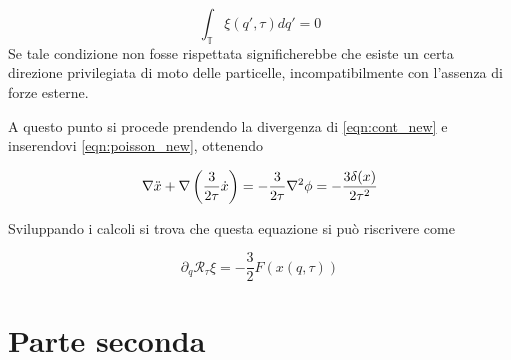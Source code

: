 \begin{equation}
    \int_{\mathbb{T}}\xi(q', \tau) dq' = 0
\end{equation}
Se tale condizione non fosse rispettata significherebbe che esiste un certa direzione
privilegiata di moto delle particelle, incompatibilmente con l'assenza di forze esterne.

A questo punto si procede prendendo la divergenza di \ref{eqn:cont_new} e inserendovi 
\ref{eqn:poisson_new}, ottenendo

\begin{equation}
    \nabla \ddot{x} + \nabla \left(\frac{3}{2\tau}\dot{x}\right) = -\frac{3}{2\tau}\laplacian\phi = -\frac{3\delta(x)}{2\tau^2}
\end{equation}

Sviluppando i calcoli si trova che questa equazione si può riscrivere come 

\begin{equation}
    \partial_q \mathcal{R}_{\tau}\xi = -\frac{3}{2}F(x(q, \tau))
\end{equation}














\section{Parte seconda}

